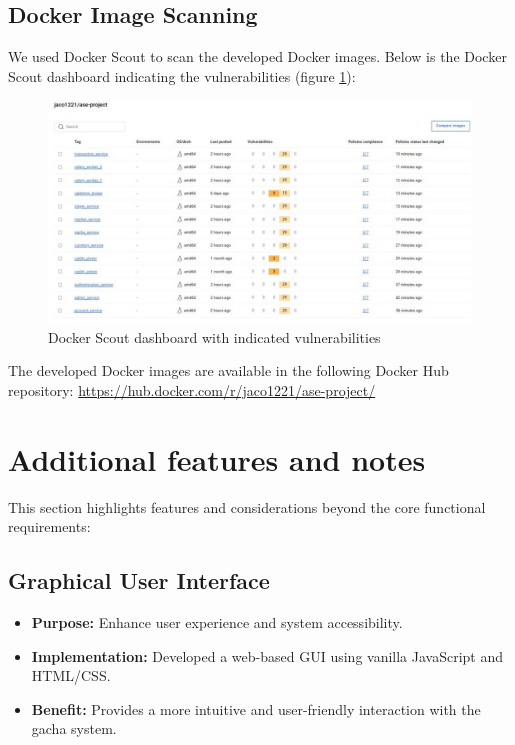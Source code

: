 \documentclass{article}
\begin{document}
\subsection{Docker Image Scanning}
We used Docker Scout to scan the developed Docker images. Below is the Docker Scout dashboard indicating the vulnerabilities (figure \ref{fig:docker_scout_dashboard}):
\begin{figure}[h]
    \centering
    \includegraphics[width=\textwidth]{docker-scout/dashboardDockerScout.jpeg}
    \caption{Docker Scout dashboard with indicated vulnerabilities}
    \label{fig:docker_scout_dashboard}
\end{figure}

The developed Docker images are available in the following Docker Hub repository:
\href{https://hub.docker.com/r/jaco1221/ase-project/}{
    https://hub.docker.com/r/jaco1221/ase-project/}
\newpage

\section{Additional features and notes}
This section highlights features and considerations beyond the core functional requirements:

\subsection{Graphical User Interface}
\begin{itemize}
    \item \textbf{Purpose:} Enhance user experience and system accessibility.
    \item \textbf{Implementation:} Developed a web-based GUI using vanilla JavaScript and HTML/CSS.
    \item \textbf{Benefit:} Provides a more intuitive and user-friendly interaction with the gacha system.
\end{itemize}
\end{document}
